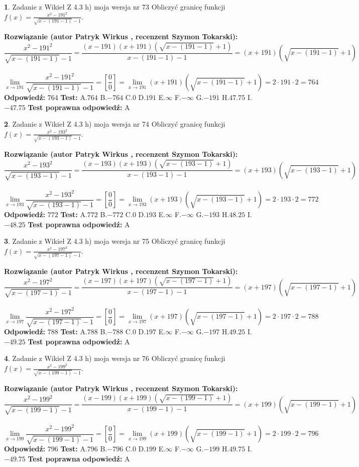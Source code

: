 \documentclass[12pt, a4paper]{article}
\theoremstyle{definition} %
\newtheorem{zad}{}
\newcommand{\zadStart}[1]{\begin{zad}#1\newline}
\newcommand{\zadStop}{\end{zad}}
\newcommand{\rozwStart}[2]{\noindent \textbf{Rozwiązanie (autor #1 , recenzent #2): }\newline}
\newcommand{\rozwStop}{\newline}
\newcommand{\odpStart}{\noindent \textbf{Odpowiedź:}\newline}
\newcommand{\odpStop}{\newline}
\newcommand{\testStart}{\noindent \textbf{Test:}\newline}
\newcommand{\testStop}{\newline}
\newcommand{\kluczStart}{\noindent \textbf{Test poprawna odpowiedź:}\newline}
\newcommand{\kluczStop}{\newline}
\begin{document}
\zadStart{Zadanie z Wikieł Z 4.3 h) moja wersja nr 73}
Obliczyć granicę funkcji $f(x)=\frac{x^{2} - 191^{2}}{\sqrt{x-(191-1)}-1}$.
\zadStop
\rozwStart{Patryk Wirkus}{Szymon Tokarski}
$$\frac{x^{2} - 191^{2}}{\sqrt{x-(191-1)}-1}=\frac{(x-191)(x+191)(\sqrt{x-(191-1)}+1)}{x-(191-1)-1}=(x+191)(\sqrt{x-(191-1)}+1)$$
\\
$$\lim\limits_{x\to 191}\frac{x^{2} - 191^{2}}{\sqrt{x-(191-1)}-1}=[\frac{0}{0}]=
\lim\limits_{x\to 191}(x+191)(\sqrt{x-(191-1)}+1) = 2\cdot191 \cdot 2 = 764$$
\rozwStop
\odpStart
$764$
\odpStop
\testStart
A.$764$
B.$-764$
C.$0$
D.$191$
E.$\infty$
F.$-\infty$
G.$-191$
H.$47.75$
I.$-47.75$
\testStop
\kluczStart
A
\kluczStop



\zadStart{Zadanie z Wikieł Z 4.3 h) moja wersja nr 74}
Obliczyć granicę funkcji $f(x)=\frac{x^{2} - 193^{2}}{\sqrt{x-(193-1)}-1}$.
\zadStop
\rozwStart{Patryk Wirkus}{Szymon Tokarski}
$$\frac{x^{2} - 193^{2}}{\sqrt{x-(193-1)}-1}=\frac{(x-193)(x+193)(\sqrt{x-(193-1)}+1)}{x-(193-1)-1}=(x+193)(\sqrt{x-(193-1)}+1)$$
\\
$$\lim\limits_{x\to 193}\frac{x^{2} - 193^{2}}{\sqrt{x-(193-1)}-1}=[\frac{0}{0}]=
\lim\limits_{x\to 193}(x+193)(\sqrt{x-(193-1)}+1) = 2\cdot193 \cdot 2 = 772$$
\rozwStop
\odpStart
$772$
\odpStop
\testStart
A.$772$
B.$-772$
C.$0$
D.$193$
E.$\infty$
F.$-\infty$
G.$-193$
H.$48.25$
I.$-48.25$
\testStop
\kluczStart
A
\kluczStop



\zadStart{Zadanie z Wikieł Z 4.3 h) moja wersja nr 75}
Obliczyć granicę funkcji $f(x)=\frac{x^{2} - 197^{2}}{\sqrt{x-(197-1)}-1}$.
\zadStop
\rozwStart{Patryk Wirkus}{Szymon Tokarski}
$$\frac{x^{2} - 197^{2}}{\sqrt{x-(197-1)}-1}=\frac{(x-197)(x+197)(\sqrt{x-(197-1)}+1)}{x-(197-1)-1}=(x+197)(\sqrt{x-(197-1)}+1)$$
\\
$$\lim\limits_{x\to 197}\frac{x^{2} - 197^{2}}{\sqrt{x-(197-1)}-1}=[\frac{0}{0}]=
\lim\limits_{x\to 197}(x+197)(\sqrt{x-(197-1)}+1) = 2\cdot197 \cdot 2 = 788$$
\rozwStop
\odpStart
$788$
\odpStop
\testStart
A.$788$
B.$-788$
C.$0$
D.$197$
E.$\infty$
F.$-\infty$
G.$-197$
H.$49.25$
I.$-49.25$
\testStop
\kluczStart
A
\kluczStop



\zadStart{Zadanie z Wikieł Z 4.3 h) moja wersja nr 76}
Obliczyć granicę funkcji $f(x)=\frac{x^{2} - 199^{2}}{\sqrt{x-(199-1)}-1}$.
\zadStop
\rozwStart{Patryk Wirkus}{Szymon Tokarski}
$$\frac{x^{2} - 199^{2}}{\sqrt{x-(199-1)}-1}=\frac{(x-199)(x+199)(\sqrt{x-(199-1)}+1)}{x-(199-1)-1}=(x+199)(\sqrt{x-(199-1)}+1)$$
\\
$$\lim\limits_{x\to 199}\frac{x^{2} - 199^{2}}{\sqrt{x-(199-1)}-1}=[\frac{0}{0}]=
\lim\limits_{x\to 199}(x+199)(\sqrt{x-(199-1)}+1) = 2\cdot199 \cdot 2 = 796$$
\rozwStop
\odpStart
$796$
\odpStop
\testStart
A.$796$
B.$-796$
C.$0$
D.$199$
E.$\infty$
F.$-\infty$
G.$-199$
H.$49.75$
I.$-49.75$
\testStop
\kluczStart
A
\kluczStop
\end{document}
